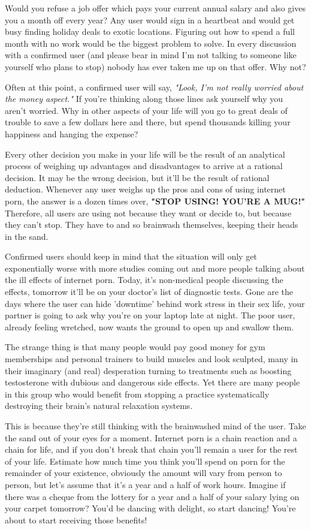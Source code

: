 \documentclass[easypeasy.tex]{subfiles}
\begin{document}
Would you refuse a job offer which pays your current annual salary and also gives you a month off every year? Any user would sign in a heartbeat and would get busy finding holiday deals to exotic locations. Figuring out how to spend a full month with no work would be the biggest problem to solve. In every discussion with a confirmed user (and please bear in mind I'm not talking to someone like yourself who plans to stop) nobody has ever taken me up on that offer. Why not?

Often at this point, a confirmed user will say, \textit{"Look, I'm not really worried about the money aspect."} If you're thinking along those lines ask yourself why you aren't worried. Why in other aspects of your life will you go to great deals of trouble to save a few dollars here and there, but spend thousands killing your happiness and hanging the expense?

Every other decision you make in your life will be the result of an analytical process of weighing up advantages and disadvantages to arrive at a rational decision. It may be the wrong decision, but it'll be the result of rational deduction. Whenever any user weighs up the pros and cons of using internet porn, the answer is a dozen times over, \textbf{"STOP USING! YOU'RE A MUG!"} Therefore, all users are using not because they want or decide to, but because they can't stop. They have to and so brainwash themselves, keeping their heads in the sand.

Confirmed users should keep in mind that the situation will only get exponentially worse with more studies coming out and more people talking about the ill effects of internet porn. Today, it's non-medical people discussing the effects, tomorrow it'll be on your doctor's list of diagnostic tests. Gone are the days where the user can hide 'downtime' behind work stress in their sex life, your partner is going to ask why you're on your laptop late at night. The poor user, already feeling wretched, now wants the ground to open up and swallow them.

The strange thing is that many people would pay good money for gym memberships and personal trainers to build muscles and look sculpted, many in their imaginary (and real) desperation turning to treatments such as boosting testosterone with dubious and dangerous side effects. Yet there are many people in this group who would benefit from stopping a practice systematically destroying their brain's natural relaxation systems.

This is because they're still thinking with the brainwashed mind of the user. Take the sand out of your eyes for a moment. Internet porn is a chain reaction and a chain for life, and if you don't break that chain you'll remain a user for the rest of your life. Estimate how much time you think you'll spend on porn for the remainder of your existence, obviously the amount will vary from person to person, but let's assume that it's a year and a half of work hours. Imagine if there was a cheque from the lottery for a year and a half of your salary lying on your carpet tomorrow? You'd be dancing with delight, so start dancing! You're about to start receiving those benefits!
\end{document}
